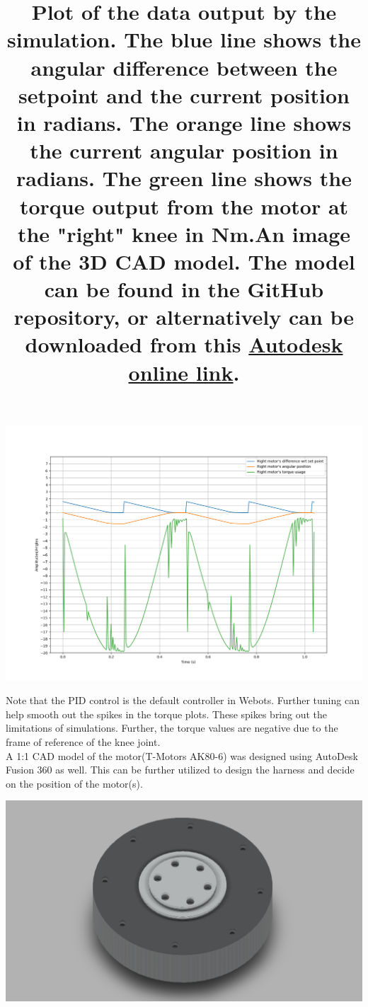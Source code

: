 \documentclass[a4paper]{article}
\begin{document}
		\begin{center}
			\includegraphics[width=\linewidth]{"../images/sim_results.png"}
			\title{Plot of the data output by the simulation. The blue line shows the angular difference between the setpoint and the current position in radians. The orange line shows the current angular position in radians. The green line shows the torque output from the motor at the "right" knee in Nm.}
		\end{center}

		Note that the PID control is the default controller in Webots. Further tuning can help smooth out the spikes in the torque plots. These spikes bring out the limitations of simulations. Further, the torque values are negative due to the frame of reference of the knee joint.\\

		A 1:1 CAD model of the motor(T-Motors AK80-6) was designed using AutoDesk Fusion 360 as well. This can be further utilized to design the harness and decide on the position of the motor(s).

		\begin{center}
			\includegraphics[width=\linewidth]{"../images/AK80-6 CAD.png"}
			\title{An image of the 3D CAD model. The model can be found in the GitHub repository, or alternatively can be downloaded from this \href{https://a360.co/3pVPdYg}{Autodesk online link}.}
		\end{center}
\end{document}
